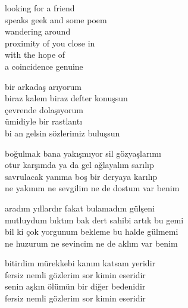\documentclass[10pt, openright, oneside]{memoir}
\theoremstyle{definition}
\begin{document}
\vspace*{\fill}
%
\newpage
{}
\vspace*{\fill}
\settowidth{\versewidth}{biraz kalem biraz defter konuşsun}
\begin{cverse}
  looking for a friend \\
  speaks geek and some poem \\
  wandering around \\
  proximity of you close in \\
  with the hope of \\
  a coincidence genuine

  bir arkadaş arıyorum \\
  biraz kalem biraz defter konuşsun \\
  çevrende dolaşıyorum \\
  ümidiyle bir rastlantı \\
  bi an gelsin sözlerimiz buluşsun
\end{cverse}
\vspace*{\fill}
%
\newpage
{}
\vspace*{\fill}
\settowidth{\versewidth}{mutluydum bıktım bak dert sahibi artık bu gemi}
\begin{cverse}
  boğulmak bana yakışmıyor sil gözyaşlarımı \\
  otur karşımda ya da gel ağlayalım sarılıp \\
  savrulacak yanıma boş bir deryaya karılıp \\
  ne yakınım ne sevgilim ne de dostum var benim

  aradım yıllardır fakat bulamadım gülşeni \\
  mutluydum bıktım bak dert sahibi artık bu gemi \\
  bil ki çok yorgunum bekleme bu halde gülmemi \\
  ne huzurum ne sevincim ne de aklım var benim \\
\end{cverse}
\vspace*{\fill}
%
\newpage
{}
\vspace*{\fill}
\settowidth{\versewidth}{fersiz nemli gözlerim sor kimin eseridir}
\begin{cverse}
  bitirdim mürekkebi kanım katsam yeridir \\
  fersiz nemli gözlerim sor kimin eseridir \\
  senin aşkın ölümün bir diğer bedenidir \\
  fersiz nemli gözlerim sor kimin eseridir
\end{cverse}
\end{document}
